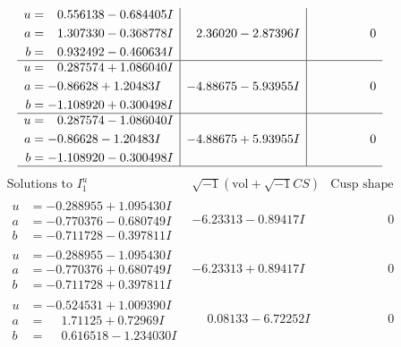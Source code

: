 \documentclass[1p]{elsarticle_modified}
\theoremstyle{definition}
\newcommand{\I}{\sqrt{-1}}
\begin{document}
$$\begin{array}{c|c|c}
\begin{aligned}
u &= \phantom{-}0.556138 - 0.684405 I \\
a &= \phantom{-}1.307330 - 0.368778 I \\
b &= \phantom{-}0.932492 - 0.460634 I\end{aligned}
 & \phantom{-}2.36020 - 2.87396 I & \phantom{-0.000000 } 0 \\ \hline\begin{aligned}
u &= \phantom{-}0.287574 + 1.086040 I \\
a &= -0.86628 + 1.20483 I \\
b &= -1.108920 + 0.300498 I\end{aligned}
 & -4.88675 - 5.93955 I & \phantom{-0.000000 } 0 \\ \hline\begin{aligned}
u &= \phantom{-}0.287574 - 1.086040 I \\
a &= -0.86628 - 1.20483 I \\
b &= -1.108920 - 0.300498 I\end{aligned}
 & -4.88675 + 5.93955 I & \phantom{-0.000000 } 0\\
 \hline 
 \end{array}$$\newpage$$\begin{array}{c|c|c}  
\text{Solutions to }I^u_{1}& \I (\text{vol} + \sqrt{-1}CS) & \text{Cusp shape}\\
 \hline 
\begin{aligned}
u &= -0.288955 + 1.095430 I \\
a &= -0.770376 - 0.680749 I \\
b &= -0.711728 - 0.397811 I\end{aligned}
 & -6.23313 - 0.89417 I & \phantom{-0.000000 } 0 \\ \hline\begin{aligned}
u &= -0.288955 - 1.095430 I \\
a &= -0.770376 + 0.680749 I \\
b &= -0.711728 + 0.397811 I\end{aligned}
 & -6.23313 + 0.89417 I & \phantom{-0.000000 } 0 \\ \hline\begin{aligned}
u &= -0.524531 + 1.009390 I \\
a &= \phantom{-}1.71125 + 0.72969 I \\
b &= \phantom{-}0.616518 - 1.234030 I\end{aligned}
 & \phantom{-}0.08133 - 6.72252 I & \phantom{-0.000000 } 0 \\ \hline\begin{aligned}

\end{aligned}
\end{array}$$
\end{document}

